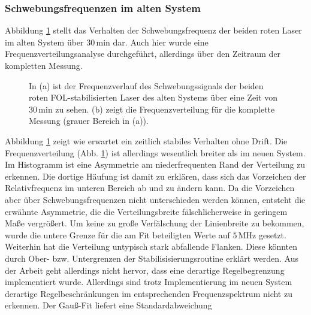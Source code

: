 \subsubsection{Schwebungsfrequenzen im alten
System}\label{subsubsec:beatfrequenzmessung_altes_system}
Abbildung \ref{fig:beatfrequenzen_alt_FOL} stellt das Verhalten der
Schwebungsfrequenz der beiden roten Laser im alten System über $30\,$min dar.
Auch hier wurde eine Frequenzverteilungsanalyse durchgeführt, allerdings über
den Zeitraum der kompletten Messung.
\begin{figure}[hp]
 	\centering
 	\footnotesize
 	\fbox{\parbox{\dimexpr \linewidth - 2\fboxrule - 2\fboxsep}{
 	\subfloat[]{
		\label{subfig:beatfrequenzen_alt_FOL_drift}
		
		}\\
 	\subfloat[]{
		\label{subfig:beatfrequenzen_alt_FOL_histogramm}
		
		}
	}}
	\caption[Beatfrequenzen - altes System mit FOL]{In (a) ist der
	Frequenzverlauf des Schwebungssignals der beiden roten
	FOL-stabilisierten Laser des alten Systems über eine Zeit von
	$30\,$min zu sehen. (b) zeigt die Frequenzverteilung für die komplette Messung
	(grauer Bereich in (a)).}
	\label{fig:beatfrequenzen_alt_FOL}
\end{figure}
Abbildung
\ref{fig:beatfrequenzen_alt_FOL}
zeigt wie erwartet ein zeitlich stabiles Verhalten ohne Drift. Die
Frequenzverteilung (Abb.
\ref{fig:beatfrequenzen_alt_FOL})
ist allerdings wesentlich breiter als im neuen System. Im Histogramm ist eine Asymmetrie am niederfrequenten Rand der
Verteilung zu erkennen. Die dortige Häufung ist damit zu erklären, dass sich das Vorzeichen
der Relativfrequenz im unteren Bereich ab und zu ändern kann. Da die Vorzeichen
aber über Schwebungsfrequenzen nicht unterschieden werden können, entsteht die erwähnte
Asymmetrie, die die Verteilungsbreite fälschlicherweise in geringem Maße
vergrößert. Um keine zu große Verfälschung der Linienbreite zu bekommen, wurde die untere Grenze für die am
Fit beteiligten Werte auf $5\,$MHz gesetzt. Weiterhin hat die Verteilung
untypisch stark abfallende Flanken. Diese könnten durch Ober- bzw.
Untergrenzen der Stabilisisierungsroutine erklärt werden. Aus der Arbeit
\cite{kuschnick:2000:diplomarbeit} geht allerdings nicht hervor, dass eine
derartige Regelbegrenzung implementiert wurde. Allerdings sind trotz
Implementierung im neuen System derartige Regelbeschränkungen im entsprechenden
Frequenzspektrum nicht zu erkennen. Der Gauß-Fit liefert eine Standardabweichung
